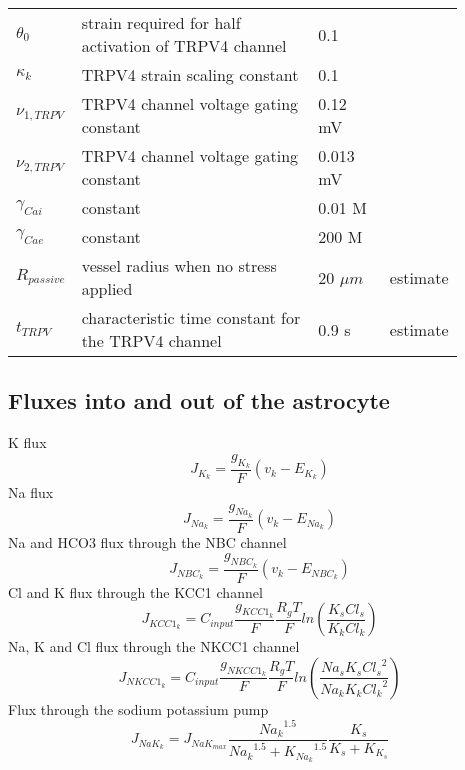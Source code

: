 \documentclass[fleqn]{report}
\numberwithin{equation}{section}
\numberwithin{equation}{section}
\newcommand{\Ca}{\text{Ca$^{2+}$}}
\newcommand{\microM}{\textmu M}
\begin{document}
\begin{table}[h!]
\centering
\begin{tabular}{ p{0.09\linewidth}  >{\footnotesize} p{0.6\linewidth}  >{\footnotesize} p{0.17\linewidth} >{\footnotesize} p{0.03\linewidth} }
\hline
$\theta_{0}$ 		           &  strain required for half activation of TRPV4 channel		& 0.1 & \cite{Witthoft2012}  \\
$\kappa_{k}$			&  		TRPV4 strain scaling constant 		& 0.1   & \cite{Witthoft2012} \\ 
$\nu_{1,TRPV}$		&  	TRPV4 channel voltage gating constant		& 0.12 mV   & \\ 
$\nu_{2,TRPV}$		&  	TRPV4 channel voltage gating constant		& 0.013 mV  & \\ 
$\gamma_{Cai}$ 		&  		\Ca constant	& 0.01 \microM   & \\
$\gamma_{Cae}$		&   	\Ca constant	& 200 \microM &   \\
$R_{passive}$			& vessel radius when no stress applied & 20 $\mu m$   &  estimate \\ 
$t_{TRPV}$			& characteristic time constant for the TRPV4 channel & 0.9 s    &  estimate \\ 
\hline
\end{tabular}
\end{table}

\subsection{Fluxes into and out of the astrocyte}
\gls{K} flux  
\begin{equation} \label{eq:J_K}
J_{K_k}=\frac{g_{K_{k}}}{F}(v_k - E_{K_k})
\end{equation}
%
\gls{Na} flux 
\begin{equation} \label{eq:J_Na}
J_{Na_k}=\frac{g_{Na_{k}}}{F}(v_k - E_{Na_k})
\end{equation}
%
\gls{Na} and \gls{HCO3} flux through the NBC channel  
\begin{equation} \label{eq:J_NBC}
J_{NBC_k}=\frac{g_{NBC_k}}{F}\left(  v_k -E_{NBC_k}  \right)
\end{equation}
%
\gls{Cl} and \gls{K} flux through the KCC1 channel  
\begin{equation} \label{eq:J_KCC1}
J_{KCC1_k}=C_{input}\frac{g_{KCC1_k}}{F}\frac{R_gT}{F}ln \left(\frac{K_s Cl_s }{K_k Cl_k}\right)
\end{equation}
%
\gls{Na}, \gls{K} and \gls{Cl} flux through the NKCC1 channel   
\begin{equation} \label{eq:J_NKCC1}
J_{NKCC1_k}=C_{input}\frac{g_{NKCC1_k}}{F}\frac{R_gT}{F}ln \left(\frac{Na_s K_s {Cl_s}^2}{Na_k K_k {Cl_k}^2}\right)
\end{equation}
%
Flux through the sodium potassium pump   
\begin{equation} \label{eq:J_NaK_s}
J_{NaK_{k}}=J_{NaK_{max}}\frac{{Na_k}^{1.5}}{{Na_k}^{1.5}+{K_{Na_k}}^{1.5}}\frac{K_s}{K_s+K_{K_s}}
\end{equation}
%
\end{document}
